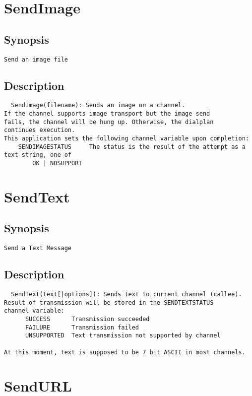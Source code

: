 \section{SendImage}
\subsection{Synopsis}
\begin{verbatim}
Send an image file
\end{verbatim}
\subsection{Description}
\begin{verbatim}
  SendImage(filename): Sends an image on a channel. 
If the channel supports image transport but the image send
fails, the channel will be hung up. Otherwise, the dialplan
continues execution.
This application sets the following channel variable upon completion:
	SENDIMAGESTATUS		The status is the result of the attempt as a text string, one of
		OK | NOSUPPORT 

\end{verbatim}


\section{SendText}
\subsection{Synopsis}
\begin{verbatim}
Send a Text Message
\end{verbatim}
\subsection{Description}
\begin{verbatim}
  SendText(text[|options]): Sends text to current channel (callee).
Result of transmission will be stored in the SENDTEXTSTATUS
channel variable:
      SUCCESS      Transmission succeeded
      FAILURE      Transmission failed
      UNSUPPORTED  Text transmission not supported by channel

At this moment, text is supposed to be 7 bit ASCII in most channels.

\end{verbatim}


\section{SendURL}
